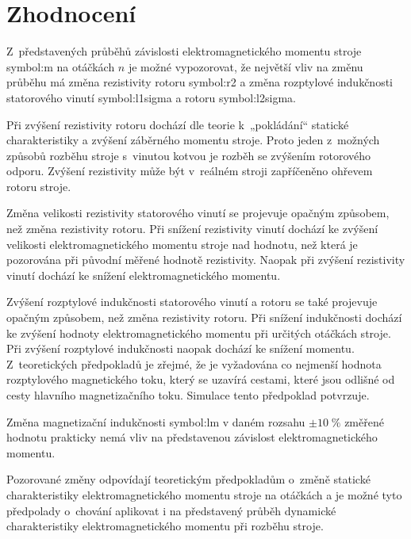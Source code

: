 \documentclass[a4paper, twoside, 11pt]{article}
\begin{document}
\newpage
{} 
\section*{Zhodnocení}
Z~představených průběhů závislosti elektromagnetického momentu stroje \gls{symbol:m} na otáčkách $n$ je možné vypozorovat, že největší vliv na změnu průběhu má změna rezistivity rotoru \gls{symbol:r2} a změna rozptylové indukčnosti statorového vinutí \gls{symbol:l1sigma} a rotoru \gls{symbol:l2sigma}.\par
Při zvýšení rezistivity rotoru dochází dle teorie k~„pokládání“ statické charakteristiky a zvýšení záběrného momentu stroje. Proto jeden z~možných způsobů rozběhu stroje s~vinutou kotvou je rozběh se zvýšením rotorového odporu. Zvýšení rezistivity může být v~reálném stroji zapříčeněno ohřevem rotoru stroje.\par
Změna velikosti rezistivity statorového vinutí se projevuje opačným způsobem, než změna rezistivity rotoru. Při snížení rezistivity vinutí dochází ke zvýšení velikosti elektromagnetického momentu stroje nad hodnotu, než která je pozorována při původní měřené hodnotě rezistivity. Naopak při zvýšení rezistivity vinutí dochází ke snížení elektromagnetického momentu.\par
Zvýšení rozptylové indukčnosti statorového vinutí a rotoru se také projevuje opačným způsobem, než změna rezistivity rotoru. Při snížení indukčnosti dochází ke zvýšení hodnoty elektromagnetického momentu při určitých otáčkách stroje. Při zvýšení rozptylové indukčnosti naopak dochází ke snížení momentu. Z~teoretických předpokladů je zřejmé, že je vyžadována co nejmenší hodnota rozptylového magnetického toku, který se uzavírá cestami, které jsou odlišné od cesty hlavního magnetizačního toku. Simulace tento předpoklad potvrzuje.\par
Změna magnetizační indukčnosti \gls{symbol:lm} v daném rozsahu $\pm 10\;\%$ změřené hodnotu prakticky nemá vliv na představenou závislost elektromagnetického momentu.\par
Pozorované změny odpovídají teoretickým předpokladům o~změně statické charakteristiky elektromagnetického momentu stroje na otáčkách a je možné tyto předpolady o~chování aplikovat i na představený průběh dynamické charakteristiky elektromagnetického momentu při rozběhu stroje.

\flushbottom %

\end{document}
